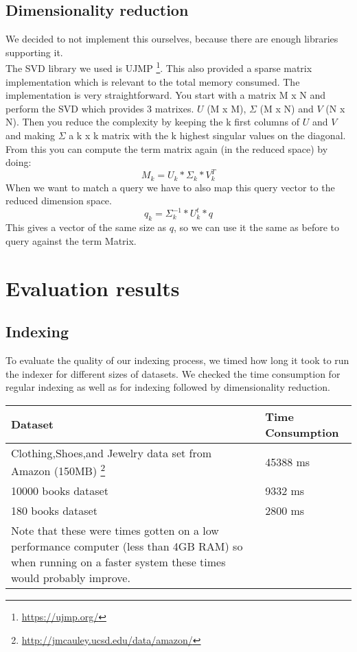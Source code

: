\documentclass[10pt,a4paper]{paper}
\begin{document}
\subsection{Dimensionality reduction}

We decided to not implement this ourselves, because there are enough libraries supporting it.\\
The SVD library we used is UJMP \footnote{\url{https://ujmp.org/}}. This also provided a sparse matrix implementation which is relevant to the total memory consumed. The implementation is very straightforward. You start with a matrix M x N and perform the SVD which provides 3 matrixes. $U$ (M x M), $\Sigma$ (M x N) and $V$ (N x N). Then you reduce the complexity by keeping the k first columns of $U$ and $V$ and making $\Sigma$ a k x k matrix with the k highest singular values on the diagonal. From this you can compute the term matrix again (in the reduced space) by doing:
\[
M_k = U_k * \Sigma_k * V_k^T
\]
When we want to match a query we have to also map this query vector to the reduced dimension space.
\[
q_k = \Sigma_k^{-1} * U_k^t * q
\]
This gives a vector of the same size as $q$, so we can use it the same as before to query against the term Matrix.

\section{Evaluation results}

\subsection{Indexing}

To evaluate the quality of our indexing process, we timed how long it took to run the indexer for different sizes of datasets. We checked the time consumption for regular indexing as well as for indexing followed by dimensionality reduction.

\begin{tabular} {l|l}
Dataset & Time Consumption \\ \hline
Clothing,Shoes,and Jewelry data set from Amazon (150MB) \footnote{\url{http://jmcauley.ucsd.edu/data/amazon/}} &  45388 ms \\ \hline
10000 books dataset & 9332 ms \\ \hline

180 books dataset & 2800 ms \\ \hline

Note that these were times gotten on a low performance computer (less than 4GB RAM) so when running on a faster system these times would probably improve.

\end{tabular}
\end{document}

